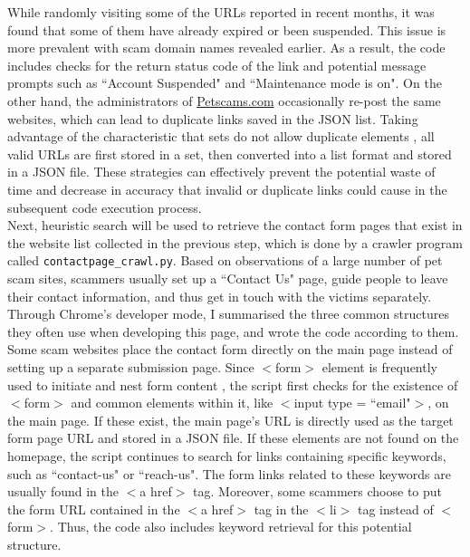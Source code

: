 \documentclass[ oneside,%
                    author={Cassie Qing Tang},
                    degree={BSc},
                     title={An Automated Response System for Disrupting Online Pet Scamming \\ },
                    subtitle={ }]{dissertation}
\begin{document}
While randomly visiting some of the URLs reported in recent months, it was found that some of them have already expired or been suspended. This issue is more prevalent with scam domain names revealed earlier. As a result, the code includes checks for the return status code of the link and potential message prompts such as ``Account Suspended" and ``Maintenance mode is on". On the other hand, the administrators of \href{www.petscams.com}{Petscams.com} occasionally re-post the same websites, which can lead to duplicate links saved in the JSON list. Taking advantage of the characteristic that sets do not allow duplicate elements \cite{sturtz_sets_nodate}, all valid URLs are first stored in a set, then converted into a list format and stored in a JSON file. These strategies can effectively prevent the potential waste of time and decrease in accuracy that invalid or duplicate links could cause in the subsequent code execution process.
\\

Next, heuristic search will be used to retrieve the contact form pages that exist in the website list collected in the previous step, which is done by a crawler program called \texttt{contactpage\_crawl.py}. Based on observations of a large number of pet scam sites, scammers usually set up a ``Contact Us" page, guide people to leave their contact information, and thus get in touch with the victims separately. Through Chrome's developer mode, I summarised the three common structures they often use when developing this page, and wrote the code according to them.
\\

Some scam websites place the contact form directly on the main page instead of setting up a separate submission page. Since $<$form$>$ element is frequently used to initiate and nest form content \cite{noauthor_how_2024}, the script first checks for the existence of $<$form$>$ and common elements within it, like $<$input type = ``email"$>$, on the main page. If these exist, the main page's URL is directly used as the target form page URL and stored in a JSON file. If these elements are not found on the homepage, the script continues to search for links containing specific keywords, such as ``contact-us" or ``reach-us". The form links related to these keywords are usually found in the $<$a href$>$ tag. Moreover, some scammers choose to put the form URL contained in the $<$a href$>$ tag in the $<$li$>$ tag instead of $<$form$>$. Thus, the code also includes keyword retrieval for this potential structure.
\end{document}
